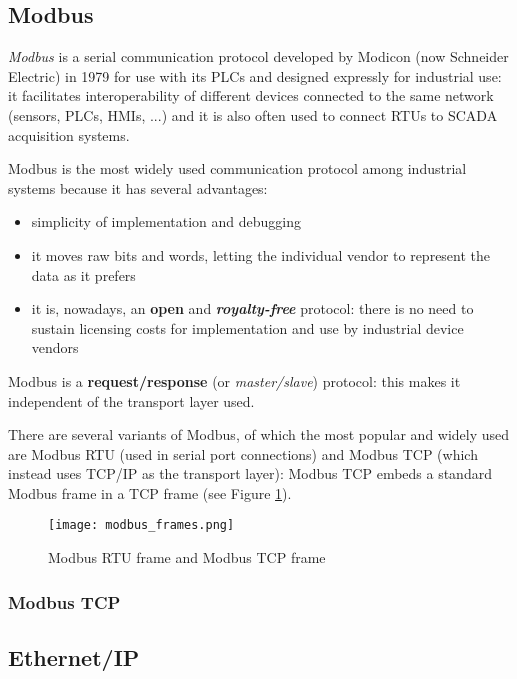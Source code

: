 \subsection{Modbus}
\label{subsec:modbus}
\textit{Modbus} is a serial communication protocol developed by Modicon (now Schneider Electric) in 1979 for use with its PLCs \cite{Modbus_definition} and designed expressly for industrial use: it facilitates interoperability of different devices connected to the same network (sensors, PLCs, HMIs, ...) and it is also often used to connect RTUs to SCADA acquisition systems.

\bigskip
Modbus is the most widely used communication protocol among industrial systems because it has several advantages:

\begin{itemize}
	\item simplicity of implementation and debugging
	\item it moves raw bits and words, letting the individual vendor to represent the data as it prefers
	\item it is, nowadays, an \textbf{open} and \textbf{\textit{royalty-free}} protocol: there is no need to sustain licensing costs for implementation and use by industrial device vendors
\end{itemize}

Modbus is a \textbf{request/response} (or \textit{master/slave}) protocol: this makes it independent of the transport layer used.

There are several variants of Modbus, of which the most popular and widely used are Modbus RTU (used in serial port connections) and Modbus TCP (which instead uses TCP/IP as the transport layer): Modbus TCP embeds a standard Modbus frame in a TCP frame (see Figure \ref{fig:modbus_frames}).

\begin{figure}[ht]
	\texttt{[image: modbus\_frames.png]}
	\caption{Modbus RTU frame and Modbus TCP frame}
	\label{fig:modbus_frames}
\end{figure}

\subsubsection{Modbus TCP}
\label{subsub:modbus_tcp}

\subsection{Ethernet/IP}

